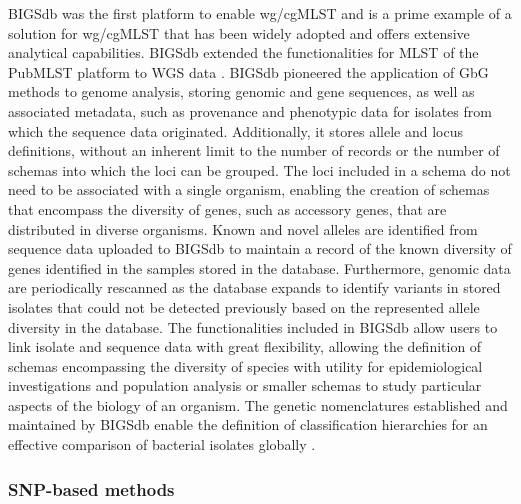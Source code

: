 \ac{BIGSdb} was the first platform to enable \ac{wg/cgMLST} and is a prime example of a solution for \ac{wg/cgMLST} that has been widely adopted and offers extensive analytical capabilities. \ac{BIGSdb} extended the functionalities for \ac{MLST} of the PubMLST platform to \ac{WGS} data \cite{jolley_bigsdb_2010, jolley_open-access_2018}. \ac{BIGSdb} pioneered the application of \ac{GbG} methods to genome analysis, storing genomic and gene sequences, as well as associated metadata, such as provenance and phenotypic data for isolates from which the sequence data originated. Additionally, it stores allele and locus definitions, without an inherent limit to the number of records or the number of schemas into which the loci can be grouped. The loci included in a schema do not need to be associated with a single organism, enabling the creation of schemas that encompass the diversity of genes, such as accessory genes, that are distributed in diverse organisms. Known and novel alleles are identified from sequence data uploaded to \ac{BIGSdb} to maintain a record of the known diversity of genes identified in the samples stored in the database. Furthermore, genomic data are periodically rescanned as the database expands to identify variants in stored isolates that could not be detected previously based on the represented allele diversity in the database. The functionalities included in \ac{BIGSdb} allow users to link isolate and sequence data with great flexibility, allowing the definition of schemas encompassing the diversity of species with utility for epidemiological investigations and population analysis or smaller schemas to study particular aspects of the biology of an organism. The genetic nomenclatures established and maintained by \ac{BIGSdb} enable the definition of classification hierarchies for an effective comparison of bacterial isolates globally \cite{jolley_open-access_2018}.

\subsubsection{SNP-based methods}

